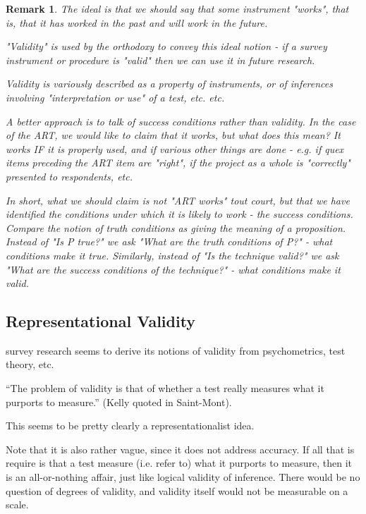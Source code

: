 \documentclass[11pt,twoside]{article}
\newtheorem{remark}{Remark}
\newcommand{\sr}{survey research}
\begin{document}
\begin{remark}
The ideal is that we should say that some instrument "works", that is, that it has worked in the past and will work in the future.

"Validity" is used by the orthodoxy to convey this ideal notion - if a
survey instrument or procedure is "valid" then we can use it in future
research.

Validity is variously described as a property of instruments, or of
inferences involving "interpretation or use" of a test, etc. etc.

A better approach is to talk of success conditions rather than
validity.  In the case of the ART, we would like to claim that it
works, but what does this mean?  It works IF it is properly used, and
if various other things are done - e.g. if quex items preceding the
ART item are "right", if the project as a whole is "correctly"
presented to respondents, etc.

In short, what we should claim is not "ART works" tout court, but that
we have identified the conditions under which it is likely to work -
the success conditions.  Compare the notion of truth conditions as
giving the meaning of a proposition.  Instead of "Is P true?" we ask
"What are the truth conditions of P?" - what conditions make it true.
Similarly, instead of "Is the technique valid?" we ask "What are the
success conditions of the technique?" - what conditions make it valid.
\end{remark}

\subsection{Representational Validity}

\sr{} seems to derive its notions of validity from psychometrics, test theory, etc.

``The problem of validity is that of whether a test really measures
what it purports to measure.''  (Kelly quoted in Saint-Mont).

This seems to be pretty clearly a representationalist idea.

Note that it is also rather vague, since it does not address accuracy.
If all that is require is that a test measure (i.e. refer to) what it
purports to measure, then it is an all-or-nothing affair, just like
logical validity of inference.  There would be no question of degrees
of validity, and validity itself would not be measurable on a scale.
\end{document}
